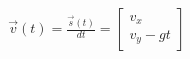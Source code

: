\documentclass[preview]{standalone}
\begin{document}
\begin{align*}
\vec{v}(t) = \frac{\vec{s}(t)}{dt} = \begin{bmatrix} v_x \\ v_y - gt \end{bmatrix}
\end{align*}
\end{document}
